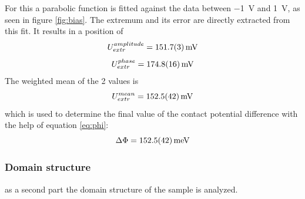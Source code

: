 \documentclass[%
 reprint,
amsmath,amssymb,
pra,
]{revtex4-1}
\begin{document}
For this a parabolic function is fitted against the data between \SI{-1}{V} and \SI{1}{V}, as seen in figure \ref{fig:bias}. The extremum and its error are directly extracted from this fit. It results in a position of
\begin{equation*}
U_{extr}^{amplitude} = \SI{151.7 \pm 0.3}{mV}
\end{equation*}
\begin{equation*}
U_{extr}^{phase} = \SI{174.8 \pm 1.6}{mV}
\end{equation*}
The weighted mean of the 2 values is
\begin{equation*}
U_{extr}^{mean} = \SI{152.5 \pm 4.2}{mV}
\end{equation*}
which is used to determine the final value of the contact potential difference with the help of equation \ref{eq:phi}:
\begin{equation*}
\Delta\Phi = \SI{152.5 \pm 4.2}{meV}
\end{equation*}


\subsubsection{Domain structure}
as a second part the domain structure of the sample is analyzed. 



\end{document}
